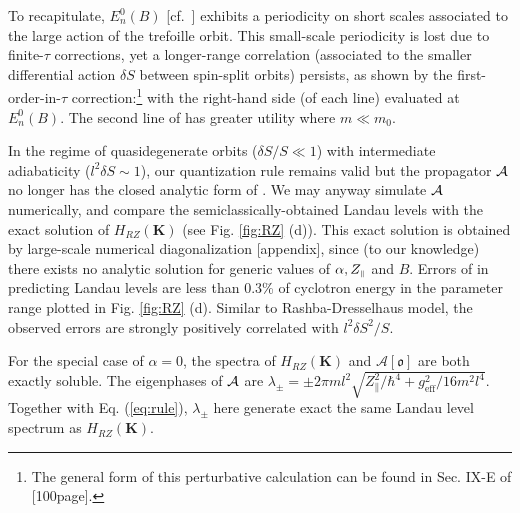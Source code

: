 \documentclass[aps, prb, showpacs, twocolumn, notitlepage, superscriptaddress]{revtex4-1}
\begin{document}
To recapitulate, $E_n^0(B)$ [cf.\ ] exhibits a periodicity on short scales associated to the large action of the trefoille orbit. This small-scale periodicity is lost due to  finite-$\tau$ corrections, yet a longer-range correlation (associated to the smaller differential action $\delta S$ between spin-split orbits) persists, as shown by the first-order-in-$\tau$ correction:\footnote{The general form of this perturbative calculation can be found in Sec. IX-E of [100page]. } 
with the right-hand side (of each line) evaluated at $E_n^0(B)$. The second line of  has greater utility where $m{\ll}m_0$. 


In the regime of quasidegenerate orbits ($\delta S/S \ll 1$) with intermediate adiabaticity ($l^2\delta S\sim 1$),  our quantization rule  remains valid but the propagator ${\cal A}$ no longer has the closed analytic form of . We may anyway simulate ${\cal A}$ numerically, and compare the semiclassically-obtained Landau levels with the exact solution of $H_{RZ}(\boldsymbol{K})$ (see Fig. \ref{fig:RZ} (d)). This exact solution is obtained by large-scale numerical diagonalization [appendix], since (to our knowledge) there exists no analytic solution for generic values of $\alpha,Z_{\scriptscriptstyle{\parallel}}$ and $B$. Errors of  in predicting Landau levels are less than 0.3\% of cyclotron energy in the parameter range plotted in Fig. \ref{fig:RZ} (d). Similar to Rashba-Dresselhaus model, the observed errors are strongly positively correlated with $l^2\delta S^2/S$.


For the special case of $\alpha=0$, the spectra of $H_{RZ}(\boldsymbol{K})$ and $\mathcal{A}[\mathfrak{o}]$ are both exactly soluble. The eigenphases of ${\cal A}$ are $\lambda_{\pm}=\pm 2\pi ml^2\sqrt{Z_\parallel^2/\hbar^4+g_\text{eff}^2/16m^2l^4}$. Together with Eq. (\ref{eq:rule}), $\lambda_\pm$ here generate exact the same Landau level spectrum as $H_{RZ}(\boldsymbol{K})$.



\end{document}
